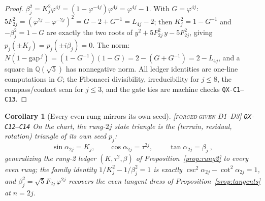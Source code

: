 \documentclass[11pt]{article}
\newcommand{\tagFD}{\textcolor{cF}{\textsc{[forced}}\,\textcolor{cD}{\textsc{given D1--D3]}}}
\newcommand{\hx}[1]{\textcolor{cC}{\footnotesize\texttt{#1}}}
\newcommand{\Q}{\mathbb{Q}}
\newcommand{\gp}{\varphi}
\newcommand{\gapc}{\mathrm{gap}}
\theoremstyle{plain}
\newtheorem{corollary}[theorem]{Corollary}
\theoremstyle{definition}
\theoremstyle{remark}
\begin{document}
\begin{proof}
$\beta_j^2=K_j^2\gp^{4j}=(1-\gp^{-4j})\gp^{4j}=\gp^{4j}-1$. With
$G=\gp^{4j}$: $5F_{2j}^2=(\gp^{2j}-\gp^{-2j})^2=G-2+G^{-1}=L_{4j}-2$;
then $K_j^2=1-G^{-1}$ and $-\beta_j^2=1-G$ are exactly the two roots of
$y^2+5F_{2j}^2\,y-5F_{2j}^2$, giving $p_j(\pm K_j)=p_j(\pm i\beta_j)=0$.
The norm: $N(1-\gapc^{\,j})=(1-G^{-1})(1-G)=2-(G+G^{-1})=2-L_{4j}$, and a
square in $\Q(\sqrt5)$ has nonnegative norm. All ledger identities are
one-line computations in $G$; the Fibonacci divisibility, irreducibility
for $j\le8$, the compass/contact scan for $j\le3$, and the gate ties are
machine checks \hx{QX-C1--C13}.
\end{proof}

\begin{corollary}[Every even rung mirrors its own seed]\label{cor:evenmirror}\tagFD{} \hx{QX-C12--C14}
On the chart, the rung-$2j$ state triangle is the (terrain, residual,
rotation) triangle of its \emph{own} seed $p_j$:
\[
\sin\alpha_{2j}=K_j,\qquad \cos\alpha_{2j}=\tau^{2j},\qquad
\boxed{\ \tan\alpha_{2j}=\beta_j\ },
\]
generalizing the rung-2 ledger $(K,\tau^2,\beta)$ of
Proposition~\ref{prop:rung2} to every even rung; the family identity
$1/K_j^2-1/\beta_j^2=1$ is exactly
$\csc^2\alpha_{2j}-\cot^2\alpha_{2j}=1$, and
$\beta_j^2=\sqrt5F_{2j}\,\gp^{2j}$ recovers the even tangent dress of
Proposition~\ref{prop:tangents} at $n=2j$.
\end{corollary}
\end{document}
